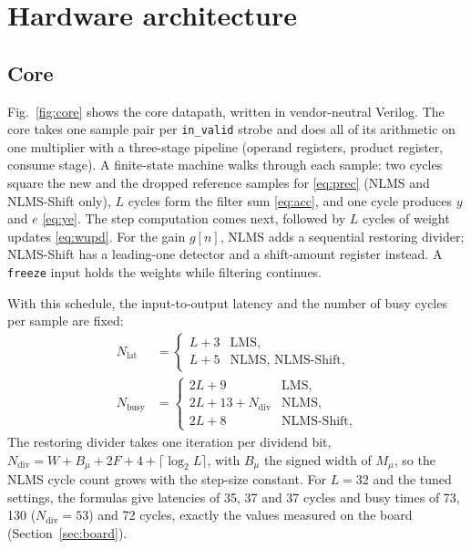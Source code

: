 \section{Hardware architecture}\label{sec:hw}
\subsection{Core}\label{sec:core}
Fig.~\ref{fig:core} shows the core datapath, written in vendor-neutral Verilog. The core
takes one sample pair per \texttt{in\_valid} strobe and does all of its arithmetic on one multiplier with a
three-stage pipeline (operand registers, product register, consume stage). A finite-state machine walks
through each sample: two cycles square the new and the dropped reference samples for \eqref{eq:prec}
(NLMS and NLMS-Shift only), $L$ cycles form the filter sum \eqref{eq:acc}, and one cycle produces $y$ and
$e$ \eqref{eq:ye}. The step computation comes next, followed by $L$ cycles of weight updates
\eqref{eq:wupd}. For the gain $g[n]$, NLMS adds a sequential restoring divider; NLMS-Shift has a
leading-one detector and a shift-amount register instead. A \texttt{freeze} input holds the weights while
filtering continues.

\begin{\WF}[!htbp]\centering
{}
\caption{Datapath of the ANC core. The power update, filter sum, step computation and weight updates all
share one multiplier; the three algorithms differ only in the step unit. Dashed lines are control
signals.}\label{fig:core}
\end{\WF}

With this schedule, the input-to-output latency and the number of busy cycles per sample are fixed:
\begin{align}
N_{\text{lat}} &= \begin{cases} L+3 & \text{LMS},\\ L+5 & \text{NLMS, NLMS-Shift},\end{cases} \label{eq:lat}\\
N_{\text{busy}} &= \begin{cases} 2L+9 & \text{LMS},\\ 2L+13+N_{\text{div}} & \text{NLMS},\\ 2L+8 & \text{NLMS-Shift},\end{cases} \label{eq:busy}
\end{align}
The restoring divider takes one iteration per dividend bit,
$N_{\text{div}}=W+B_\mu+2F+4+\lceil\log_2 L\rceil$, with $B_\mu$ the signed width of $M_\mu$, so the NLMS
cycle count grows with the step-size constant. For $L=32$ and the tuned settings, the formulas give
latencies of 35, 37 and 37 cycles and busy times of 73, 130 ($N_{\text{div}}=53$) and 72 cycles, exactly
the values measured on the board (Section~\ref{sec:board}).

